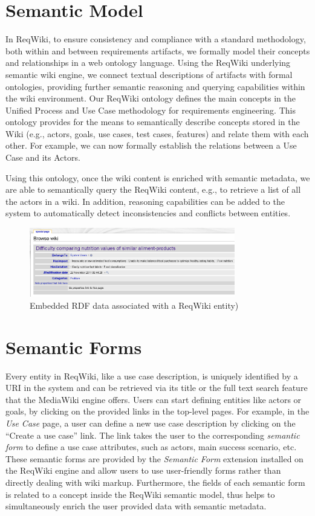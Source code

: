 \documentclass[10pt,twoside,openany,bibtotoc,liststotoc]{scrbook}
\begin{document}
\section{Semantic Model}
In ReqWiki, to ensure consistency and compliance with a standard methodology, both within and between requirements artifacts, we formally model their concepts and relationships in a web ontology language. Using the ReqWiki underlying semantic wiki engine, we connect textual descriptions of artifacts with formal ontologies, providing further semantic reasoning and querying capabilities within the wiki environment. Our ReqWiki ontology defines the main concepts in the Unified Process and Use Case methodology for requirements engineering.  This ontology provides for the means to semantically describe concepts stored in the Wiki (e.g., actors, goals, use cases, test cases, features) and relate them with each other. For example, we can now formally establish the relations between a Use Case and its Actors.

Using this ontology, once the wiki content is enriched with semantic metadata, we are able to semantically query the ReqWiki content, e.g., to retrieve a list of all the actors in a wiki. In addition, reasoning capabilities can be added to the system to automatically detect inconsistencies and conflicts between entities.

\begin{figure}[h]
  \centering
  \includegraphics[width=0.8\textwidth]{reqwiki-rdf}
  \caption{Embedded RDF data associated with a ReqWiki entity)}
  \label{fig:form-rdf}
\end{figure}

\section{Semantic Forms}
Every entity in ReqWiki, like a use case description, is uniquely identified by a URI in the system and can be retrieved via its title or the full text search feature that the MediaWiki engine offers. Users can start defining entities like actors or goals, by clicking on the provided links in the top-level pages. For example, in the \emph{Use Case} page, a user can define a new use case description by clicking on the ``Create a use case'' link. The link takes the user to the corresponding \emph{semantic form} to define a use case attributes, such as actors, main success scenario, etc. These semantic forms are provided by the \emph{Semantic Form} extension installed on the ReqWiki engine and allow users to use user-friendly forms rather than directly dealing with wiki markup. Furthermore, the fields of each semantic form is related to a concept inside the ReqWiki semantic model, thus helps to simultaneously enrich the user provided data with semantic metadata. 
\end{document}
